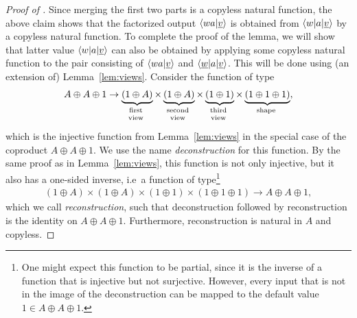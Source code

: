\begin{proof}[Proof of ]
    Since merging the first two parts is a copyless natural function,  the above claim shows that  the factorized output $\langle wa|\underline v \rangle$ is obtained from $\langle w|a|\underline v \rangle$ by a copyless natural function. To complete the proof of the lemma, we will show that latter value $\langle w|a|\underline v \rangle$  can also be obtained by applying some copyless natural function to the pair consisting of  $\langle wa|\underline v \rangle$  and $\langle \underline w|a|\underline v \rangle$. This will be done using (an extension of) Lemma~\ref{lem:views}.
    Consider the function of type 
    \begin{align*}
        A \oplus A \oplus 1 \to \myunderbrace{(1 \oplus A)}{first\\ view} \times
       \myunderbrace{(1 \oplus A)}{second\\ view} \times
       \myunderbrace{(1 \oplus 1)}{third\\ view} \times 
       \myunderbrace{(1 \oplus 1 \oplus 1)}{shape},
       \end{align*}
    which is the injective function from Lemma~\ref{lem:views} in the special case of the coproduct $A \oplus A \oplus 1$. We use the name \emph{deconstruction} for this function. By the same proof as in  Lemma~\ref{lem:views}, this function is not only injective, but it also has a one-sided inverse, i.e~a function of type\footnote{One might expect this function to be partial, since it is the inverse of a function that is injective but not surjective. However, every input that is not in the image of the deconstruction can be mapped to the default value $1 \in A \oplus A \oplus 1$.}
    \begin{align*}
(1 \oplus A) \times (1 \oplus A) \times (1 \oplus 1) \times (1 \oplus 1 \oplus 1) \to A \oplus A \oplus 1,
    \end{align*}
   which we call \emph{reconstruction},  such that deconstruction followed by reconstruction is the identity on $A \oplus A \oplus 1$. Furthermore,  reconstruction is natural in $A$ and copyless.


\end{proof}
